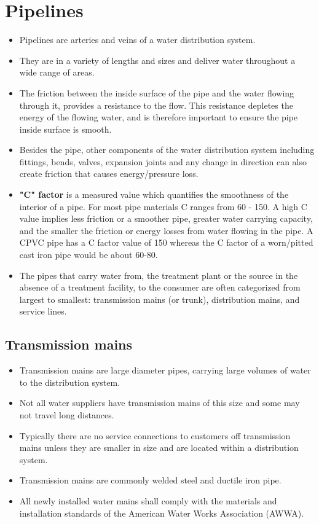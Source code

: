 \section{Pipelines}
\begin{itemize}
\item Pipelines are arteries and veins of a water distribution system. 
\item They are in a variety of lengths and sizes and deliver water throughout a wide range of areas.
\item The friction between the inside surface of the pipe and the water flowing through it, provides a resistance to the flow.  This resistance depletes the energy of the flowing water,  and is therefore important to ensure the pipe inside surface is smooth.
\item Besides the pipe, other components of the water distribution system including fittings, bends, valves, expansion joints and any change in direction can also create friction that causes energy/pressure loss.
\item \textbf{"C" factor}  is a measured value which quantifies the smoothness of the interior of a pipe. For most pipe materials C ranges from 60 - 150. A high C value implies less friction or a smoother pipe, greater water carrying capacity, and the smaller the friction or energy losses from water flowing in the pipe. A CPVC pipe has a C factor value of 150 whereas the C factor of a worn/pitted cast iron pipe would be about 60-80.
\item The pipes that carry water from, the treatment plant or the source in the absence of a treatment facility, to the consumer are often categorized from largest to smallest: transmission mains (or trunk), distribution mains, and service lines.
\end{itemize}
\subsection{Transmission mains}
\begin{itemize}
\item Transmission mains are large diameter pipes, carrying large volumes of water to the distribution system. 
\item Not all water suppliers have transmission mains of this size and some may not travel long distances. 
\item Typically there are no service connections to
customers off transmission mains unless they are smaller in size and are located within a distribution system.
\item Transmission mains are commonly welded steel and ductile iron pipe.
\item All newly installed water mains shall comply with the materials and installation standards of the American Water Works Association (AWWA).
\end{itemize}

